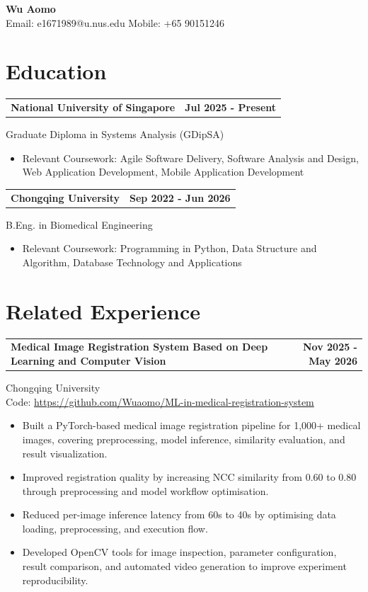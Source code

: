 \documentclass[11pt]{article}
\makeatletter
\newcommand{\resumeHeader}[3]{
  \begin{center}
    {\LARGE\bfseries #1}\\[-0.05em]
    {\large Email: #2\hspace{1.35em} Mobile: #3}
  \end{center}
  \vspace{0.95em}
}
\newcommand{\entry}[4]{
  \begin{tabularx}{\textwidth}{@{}Xr@{}}
    {\bfseries #1} & {\bfseries #2} \\
  \end{tabularx}
  #3\\
  #4
}
\newcommand{\projectEntry}[4]{
  \begin{tabularx}{\textwidth}{@{}Xr@{}}
    {\bfseries #1} & {\bfseries #2} \\
  \end{tabularx}
  #3\\
  Code: \href{#4}{#4}
}
\makeatother
\begin{document}
\resumeHeader{Wu Aomo}{e1671989@u.nus.edu}{+65 90151246}

\section*{Education}

\entry
  {National University of Singapore}
  {Jul 2025 - Present}
  {Graduate Diploma in Systems Analysis (GDipSA)}
  {
    \begin{itemize}
      \item Relevant Coursework: Agile Software Delivery, Software Analysis and Design, Web Application Development, Mobile Application Development
    \end{itemize}
  }

\vspace{0.12em}

\entry
  {Chongqing University}
  {Sep 2022 - Jun 2026}
  {B.Eng. in Biomedical Engineering}
  {
    \begin{itemize}
      \item Relevant Coursework: Programming in Python, Data Structure and Algorithm, Database Technology and Applications
    \end{itemize}
  }

\section*{Related Experience}

\projectEntry
  {Medical Image Registration System Based on Deep Learning and Computer Vision}
  {Nov 2025 - May 2026}
  {Chongqing University}
  {https://github.com/Wuaomo/ML-in-medical-registration-system}

\begin{itemize}
  \item Built a PyTorch-based medical image registration pipeline for 1,000+ medical images, covering preprocessing, model inference, similarity evaluation, and result visualization.
  \item Improved registration quality by increasing NCC similarity from 0.60 to 0.80 through preprocessing and model workflow optimisation.
  \item Reduced per-image inference latency from 60s to 40s by optimising data loading, preprocessing, and execution flow.
  \item Developed OpenCV tools for image inspection, parameter configuration, result comparison, and automated video generation to improve experiment reproducibility.
\end{itemize}
\end{document}
